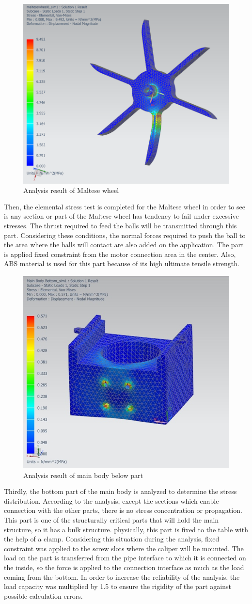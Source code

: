 \documentclass[12pt]{article}
\begin{document}
\begin{figure}[H]
    \centering
    \includegraphics[width=0.5\linewidth]{malteseanalysisfinal.png}
    \caption{Analysis result of Maltese wheel}
    \label{fig:malteseanalysisfinal}
\end{figure}

Then, the elemental stress test is completed for the Maltese wheel in order to see is any section or part of the Maltese wheel has tendency to fail under excessive stresses. 
The thrust required to feed the balls will be transmitted through this part. Considering these conditions, the normal forces required to push the ball to the area where the balls will contact are also added on the application. The part is applied fixed constraint from the motor connection area in the center. Also, ABS material is used for this part because of its high ultimate tensile strength.

\begin{figure}[H]
    \centering
    \includegraphics[width=0.5\linewidth]{mainbodybelowfinal.png}
    \caption{Analysis result of main body below part}
    \label{mainbodybelow}
\end{figure}

Thirdly, the bottom part of the main body is analyzed to determine the stress distribution. According to the analysis, except the sections which enable connection with the other parts, there is no stress concentration or propagation.
This part is one of the structurally critical parts that will hold the main structure, so it has a bulk structure. physically, this part is fixed to the table with the help of a clamp. Considering this situation during the analysis, fixed constraint was applied to the screw slots where the caliper will be mounted.  The load on the part is transferred from the pipe interface to which it is connected on the inside, so the force is applied to the connection interface as much as the load coming from the bottom. In order to increase the reliability of the analysis, the load capacity was multiplied by 1.5 to ensure the rigidity of the part against possible calculation errors.
\end{document}
